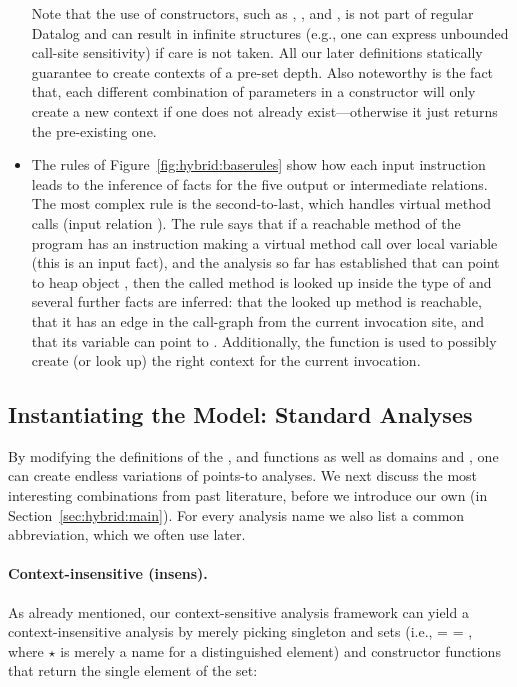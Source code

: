 \begin{itemize}
Note that the use of constructors, such as , , and , is not part of regular Datalog and can result in infinite structures (e.g., one can express unbounded call-site sensitivity) if care is not taken. All our later definitions statically guarantee to create contexts of a pre-set depth. Also noteworthy is the fact that, each different combination of parameters in a constructor will only create a new context if one does not already exist---otherwise it just returns the pre-existing one.

\item The rules of Figure~\ref{fig:hybrid:baserules} show how each input instruction leads to the inference of facts for the five output or intermediate relations. The most complex rule is the second-to-last, which handles virtual method calls (input relation ). The rule says that if a reachable method of the program has an instruction making a virtual method call over local variable  (this is an input fact), and the analysis so far has established that  can point to heap object , then the called method is looked up inside the type of  and several further facts are inferred: that the looked up method is reachable, that it has an edge in the call-graph from the current invocation site, and that its  variable can point to . Additionally, the  function is used to possibly create (or look up) the right context for the current invocation.
\end{itemize}


\subsection{Instantiating the Model: Standard Analyses}
\label{sec:hybrid:instances}

By modifying the definitions of the ,  and  functions as well as domains  and , one can create endless variations of points-to analyses. We next discuss the most interesting combinations from past literature, before we introduce our own (in Section~\ref{sec:hybrid:main}). For every analysis name we also list a common abbreviation, which we often use later.

\paragraph{Context-insensitive (insens).}
As already mentioned, our context-sensitive analysis framework can yield a context-insensitive analysis by merely picking singleton  and  sets (i.e.,  =  = \args{\{$\star$\}}, where $\star$ is merely a name for a distinguished element) and constructor functions that return the single element of the set:

